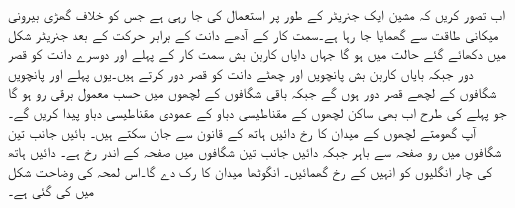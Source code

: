 اب  تصور کریں کہ مشین ایک جنریٹر کے طور پر استعمال کی جا رہی ہے جس کو خلاف  گھڑی  بیرونی میکانی طاقت سے گھمایا جا رہا ہے۔سمت کار کے آدھے دانت کے برابر حرکت  کے بعد جنریٹر  شکل  میں دکھائے گئے حالت میں ہو گا جہاں  دایاں کاربن بش سمت کار کے پہلے اور دوسرے دانت کو قصر دور جبکہ بایاں کاربن بش  پانچویں اور چھٹے دانت کو قصر دور کرتے ہیں۔یوں پہلے اور پانچویں شگافوں کے لچھے قصر دور ہوں گے جبکہ باقی شگافوں کے لچھوں میں حسب معمول برقی رو ہو گا جو پہلے کی طرح اب بھی ساکن لچھوں کے مقناطیسی دباو کے عمودی  مقناطیسی دباو پیدا کریں گے۔آپ گھومتے لچھوں کے میدان کا رخ دائیں ہاتھ کے قانون سے جان سکتے ہیں۔ بائیں جانب تین شگافوں میں رو صفحہ سے باہر جبکہ دائیں جانب تین شگافوں میں صفحہ کے اندر رخ ہے۔ دائیں ہاتھ کی چار انگلیوں کو انہیں کے رخ گھمائیں۔ انگوٹھا میدان کا رک دے گا۔اس لمحہ کی وضاحت شکل   میں کی گئی ہے۔
